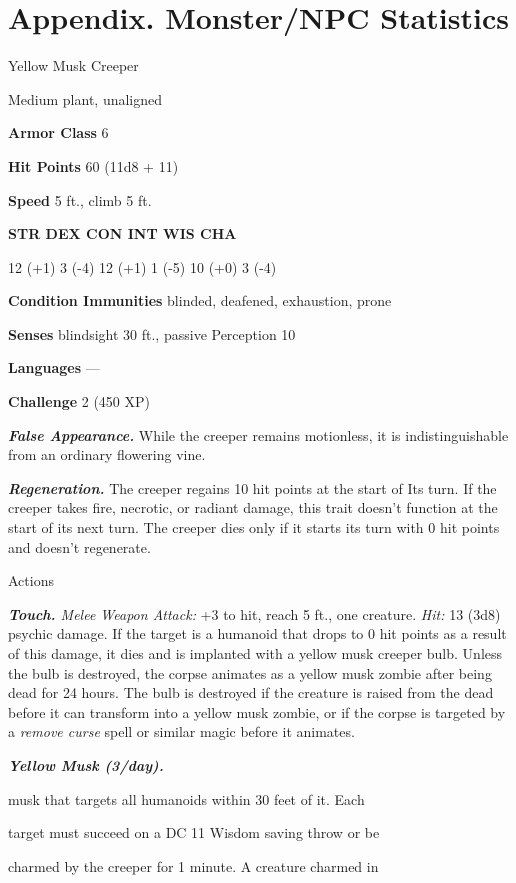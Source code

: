 \section{Appendix. Monster/NPC
Statistics}\label{appendix.-monsternpc-statistics}

Yellow Musk Creeper

Medium plant, unaligned

\textbf{Armor Class} 6

\textbf{Hit Points} 60 (11d8 + 11)

\textbf{Speed} 5 ft., climb 5 ft.

\textbf{STR DEX CON INT WIS CHA}

12 (+1) 3 (-4) 12 (+1) 1 (-5) 10 (+0) 3 (-4)

\textbf{Condition Immunities} blinded, deafened, exhaustion, prone

\textbf{Senses} blindsight 30 ft., passive Perception 10

\textbf{Languages} ---

\textbf{Challenge} 2 (450 XP)

\emph{\textbf{False Appearance.}} While the creeper remains motionless,
it is indistinguishable from an ordinary flowering vine.

\emph{\textbf{Regeneration.}} The creeper regains 10 hit points at the
start of Its turn. If the creeper takes fire, necrotic, or radiant
damage, this trait doesn't function at the start of its next turn. The
creeper dies only if it starts its turn with 0 hit points and doesn't
regenerate.

Actions

\emph{\textbf{Touch.} Melee Weapon Attack:} +3 to hit, reach 5 ft., one
creature. \emph{Hit:} 13 (3d8) psychic damage. If the target is a
humanoid that drops to 0 hit points as a result of this damage, it dies
and is implanted with a yellow musk creeper bulb. Unless the bulb is
destroyed, the corpse animates as a yellow musk zombie after being dead
for 24 hours. The bulb is destroyed if the creature is raised from the
dead before it can transform into a yellow musk zombie, or if the corpse
is targeted by a \emph{remove curse} spell or similar magic before it
animates.

\emph{\textbf{Yellow Musk (3/day). }}

musk that targets all humanoids within 30 feet of it. Each

target must succeed on a DC 11 Wisdom saving throw or be

charmed by the creeper for 1 minute. A creature charmed in

